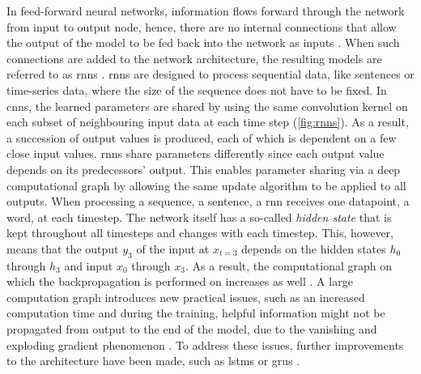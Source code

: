 In feed-forward neural networks, information flows forward through the network from input to output node, hence, there are no internal connections that allow
the output of the model to be fed back into the network as inputs \cite{aggarwal2018NeuralNetworksDeep, Goodfellow-et-al-2016}.
When such connections are added to the network architecture, the resulting models are referred to as \glspl{rnn} \cite{rumelhart1986LearningRepresentationsBackpropagating}.
\Glspl{rnn} are designed to process sequential data, like sentences or time-series data, where the size of the sequence does not have to be fixed.
In \glspl{cnn}, the learned parameters are shared by using the same convolution kernel on each subset of neighbouring input data at each time step (\autoref{fig:rnns}). 
As a result, a succession of output values is produced, each of which is dependent on a few close input values. 
\glspl{rnn} share parameters differently since each output value depends on its predecessors' output. 
This enables parameter sharing via a deep computational graph by allowing the same update algorithm to be applied to all outputs.
When processing a sequence, \eg a sentence, a \gls{rnn} receives one datapoint, \eg a word, at each timestep.
The network itself has a so-called \textit{hidden state} that is kept throughout all timesteps and changes with each timestep.
This, however, means that the output $y_3$ of the input at $x_{t=3}$ depends on the hidden states $h_0$ through $h_3$ and input $x_0$ through $x_3$.
As a result, the computational graph on which the backpropagation is performed on increases as well \cite{aggarwal2018NeuralNetworksDeep}.
A large computation graph introduces new practical issues, such as an increased computation time and during the training, helpful information might not be propagated from output to the end of the model,
due to the vanishing and exploding gradient phenomenon \cite{aggarwal2018NeuralNetworksDeep}.
To address these issues, further improvements to the architecture have been made, such as \glspl{lstm} \cite{hochreiter1997LongShortTermMemory} or \glspl{gru} \cite{cho2014PropertiesNeuralMachine}.

